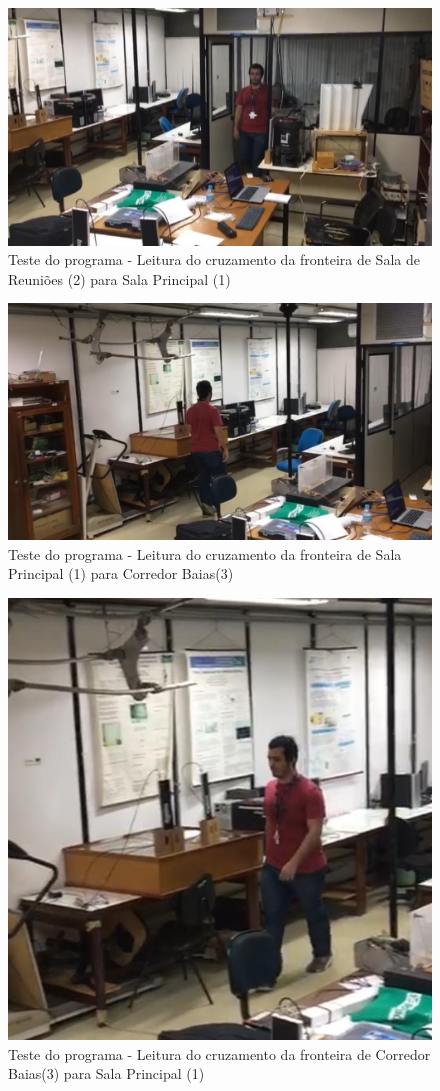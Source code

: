 \begin{figure}[H]
    \centering
    \includegraphics[width=0.5\linewidth]{figs/Resultados/cruzamento21.jpeg}
    \caption{Teste do programa - Leitura do cruzamento da fronteira de Sala de Reuniões (2) para Sala Principal (1)}
    \label{fig:cruzamento21}
\end{figure}

\begin{figure}[H]
    \centering
    \includegraphics[width=0.5\linewidth]{figs/Resultados/cruzamento13.jpeg}
    \caption{Teste do programa - Leitura do cruzamento da fronteira de Sala Principal (1) para Corredor Baias(3)}
    \label{fig:cruzamento13}
\end{figure}

\begin{figure}[H]
    \centering
    \includegraphics[width=0.5\linewidth]{figs/Resultados/cruzamento31.jpeg}
    \caption{Teste do programa - Leitura do cruzamento da fronteira de Corredor Baias(3) para Sala Principal (1)}
    \label{fig:cruzamento31}
\end{figure}

